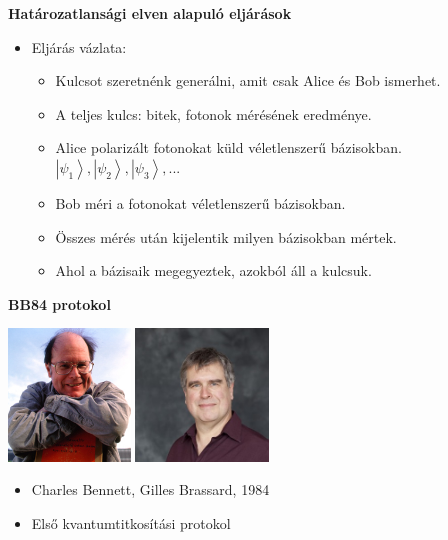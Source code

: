 \documentclass{beamer}
\begin{document}
    \begin{frame}

        \center

        \textbf{Határozatlansági elven alapuló eljárások}

        \begin{itemize}
            \item Eljárás vázlata:
            \begin{itemize}
                \item Kulcsot szeretnénk generálni, amit csak Alice és Bob ismerhet.
                \item A teljes kulcs: bitek, fotonok mérésének eredménye.
                \item Alice polarizált fotonokat küld véletlenszerű bázisokban.\\
                    $\left| \psi_1 \right\rangle, \left| \psi_2 \right\rangle, \left| \psi_3 \right\rangle, ...$
                \item Bob méri a fotonokat véletlenszerű bázisokban.
                \item Összes mérés után kijelentik milyen bázisokban mértek.
                \item Ahol a bázisaik megegyeztek, azokból áll a kulcsuk.
            \end{itemize}
        \end{itemize}

    \end{frame}

    \begin{frame}

        \center

        \textbf{BB84 protokol}

        \includegraphics[height=100pt]{bennett.jpg}
        \includegraphics[height=100pt]{brassard.jpg}

        \begin{itemize}
            \item Charles Bennett, Gilles Brassard, 1984
            \item Első kvantumtitkosítási protokol
        \end{itemize}

    \end{frame}
\end{document}
